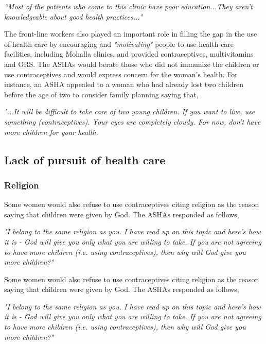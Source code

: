 \textit{“Most of the patients who come to this clinic have poor education...They aren’t knowledgeable about good health practices..."}

The front-line workers also played an important role in filling the gap in the use of health care by encouraging and \textit{"motivating"} people to use health care facilities, including Mohalla clinics, and provided contraceptives, multivitamins and ORS. The ASHAs would berate those who did not immunize the children or use contraceptives and would express concern for the woman's health. For instance, an ASHA appealed to a woman who had already lost two children before the age of two to consider family planning saying that, 

\textit{"...It will be difficult to take care of two young children. If you want to live, use something (contraceptives). Your eyes are completely cloudy. For now, don’t have more children for your health.}

\subsection{
Lack of pursuit of health care}

\subsubsection{Religion}

Some women would also refuse to use contraceptives citing religion as the reason saying that children were given by God. The ASHAs responded as follows,

\textit{"I belong to the same religion as you. I have read up on this topic and here's how it is - God will give you only what you are willing to take. If you are not agreeing to have more children (i.e. using contraceptives), then why will God give you more children?"}

Some women would also refuse to use contraceptives citing religion as the reason saying that children were given by God. The ASHAs responded as follows,

\textit{"I belong to the same religion as you. I have read up on this topic and here's how it is - God will give you only what you are willing to take. If you are not agreeing to have more children (i.e. using contraceptives), then why will God give you more children?"}


